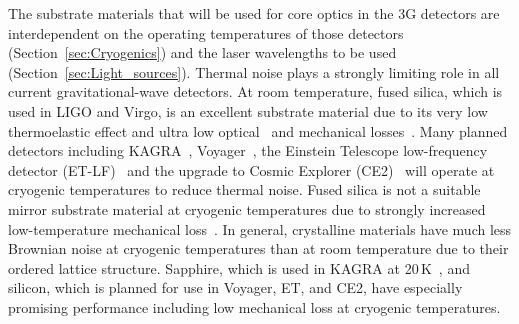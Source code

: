 The substrate materials that will be used for core optics in the \ac{3G}  detectors are interdependent on the operating temperatures of those detectors (Section~\ref{sec:Cryogenics}) and the laser wavelengths to be used (Section~\ref{sec:Light_sources}). 
Thermal noise plays a strongly limiting role in all current gravitational-wave detectors. At room temperature, fused silica, which is used in \ac{LIGO} and \ac{Virgo}, is an excellent substrate material due to its very low thermoelastic effect and ultra low optical~\cite{GEO_Absorption} and mechanical losses~\cite{Ageev_2004}. Many planned detectors
including \ac{KAGRA}~\cite{KAGRA2013}, \ac{Voyager}~\cite{VoyagerDCC2018}, the Einstein Telescope low-frequency detector (\ac{ET-LF})~\cite{ET2011} and the upgrade to Cosmic Explorer (CE2)~\cite{CosmicExplorer2017} will operate at cryogenic temperatures to reduce thermal noise. 
Fused silica is not a suitable mirror substrate material at cryogenic temperatures due to strongly increased low-temperature mechanical loss~\cite{Travasso_2007}.
In general, crystalline materials have much less Brownian noise at cryogenic temperatures than at room temperature due to their ordered lattice structure.
Sapphire, which is used in \ac{KAGRA} at 20\,K~\cite{Hirose_2014a}, and silicon, which is planned for use in \ac{Voyager}, \ac{ET}, and \ac{CE2}, have especially promising performance including low mechanical loss at cryogenic temperatures. 

